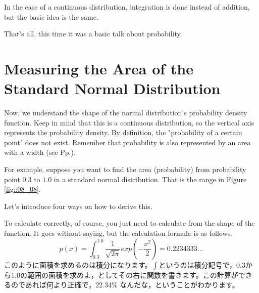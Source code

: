 In the case of a continuous distribution, integration is done instead of addition, but the basic idea is the same.

That's all, this time it was a basic talk about probability.



\section{Measuring the Area of the Standard Normal Distribution}
\label{MeasureTheNDarea}
Now, we understand the shape of the normal distribution's probability density function. Keep in mind that this is a continuous distribution, so the vertical axis represents the probability density.
By definition, the "probability of a certain point" does not exist. Remember that probability is also represented by an area with a width (see Pp.\pageref{continuousDistribution}).

For example, suppose you want to find the area (probability) from probability point $0.3$ to $1.0$ in a standard normal distribution. That is the range in Figure \ref{fig::08_08}.

Let's introduce four ways on how to derive this.


To calculate correctly, of course, you just need to calculate from the shape of the function. It goes without saying, but the calculation formula is as follows.
\[ p(x) = \int_{0.3}^{1.0} \frac{1}{\sqrt{2\pi}} exp(-\frac{x^2}{2}) =0.2234333...\]
このように面積を求めるのは積分になります。$\int$というのは積分記号で，$0.3$から$1.0$の範囲の面積を求めよ，としてその右に関数を書きます。この計算ができるのであれば何より正確で，22.34\%
なんだな，ということがわかります。

